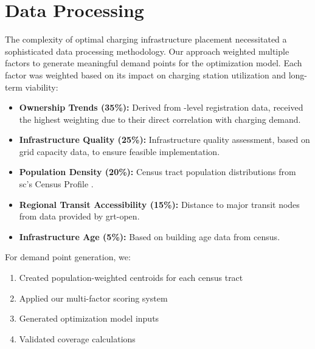 \chapter{Data Processing}

The complexity of optimal charging infrastructure placement necessitated a sophisticated data processing methodology. Our approach weighted multiple factors to generate meaningful demand points for the optimization model. Each factor was weighted based on its impact on charging station utilization and long-term viability:

\begin{itemize}
    \item \textbf{ Ownership Trends (35\%):} Derived from -level registration data, received the highest weighting due to their direct correlation with charging demand.
    
    \item \textbf{Infrastructure Quality (25\%):} Infrastructure quality assessment, based on  grid capacity data, to ensure feasible implementation.
    
    \item \textbf{Population Density (20\%):} Census tract population distributions from \gls{sc}'s Census Profile \cite{statcan_census_2021}.
    
    \item \textbf{Regional Transit Accessibility (15\%):} Distance to major transit nodes from data provided by \gls{grt-open}.
    
    \item \textbf{Infrastructure Age (5\%):} Based on building age data from census. \cite{statcan_census_2021}
\end{itemize}

For demand point generation, we:

\begin{enumerate}
    \item Created population-weighted centroids for each census tract
    \item Applied our multi-factor scoring system
    \item Generated optimization model inputs
    \item Validated coverage calculations
\end{enumerate}